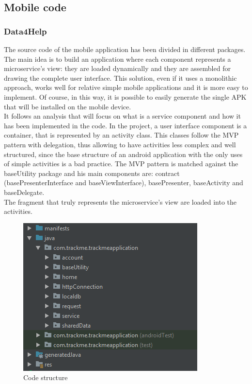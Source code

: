 \subsection{Mobile code}

\subsubsection{Data4Help}
The source code of the mobile application has been divided in different packages.
The main idea is to build an application where each component represents a microservice's view: 
they are loaded dynamically and they are assembled for drawing the complete user interface. 
This solution, even if it uses a monolithic approach, works well for relative simple mobile applications and it is more easy to implement. 
Of course, in this way, it is possible to easily generate the single APK that will be installed on the mobile device. \\
It follows an analysis that will focus on what is a service component and how it has been implemented in the code. 
In the project, a user interface component is a container, that is represented by an activity class. 
This classes follow the MVP pattern with delegation, thus allowing to have activities less complex and well structured, since the base
structure of an android application with the only uses of simple activities is a bad practice.
The MVP pattern is matched against the baseUtility package and his main components are: contract (basePresenterInterface and
baseViewInterface),
basePresenter, baseActivity and baseDelegate. \\
The fragment that truly represents the microservice's view are loaded into the activities. 

\begin{figure}[H]
\includegraphics[width=\linewidth]{images/ProjectStructure.png}
\caption{ Code structure}
\label{fig:pkgsharedata}
\end{figure}

